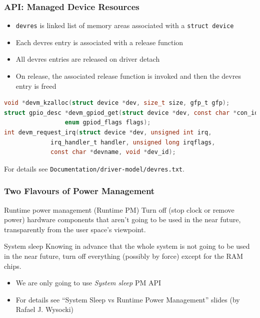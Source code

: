 \documentclass[aspectratio=169,usenames,dvipsnames]{beamer}
\newcounter{cont}
\begin{document}
\begin{frame}[containsverbatim]
  \frametitle{API: Managed Device Resources}

  \begin{itemize}
    \item \texttt{devres} is linked list of memory areas associated with a
          \texttt{struct device}
    \item Each devres entry is associated with a release function
    \item All devres entries are released on driver detach
    \item On release, the associated release function is invoked and then the
devres entry is freed
  \end{itemize}

  \begin{lstlisting}[language=c,numbers=none]
void *devm_kzalloc(struct device *dev, size_t size, gfp_t gfp);
struct gpio_desc *devm_gpiod_get(struct device *dev, const char *con_id,
				 enum gpiod_flags flags);
int devm_request_irq(struct device *dev, unsigned int irq,
		     irq_handler_t handler, unsigned long irqflags,
		     const char *devname, void *dev_id);
  \end{lstlisting}

  For details see \texttt{Documentation/driver-model/devres.txt}.
\end{frame}

\begin{frame}
  \frametitle{Two Flavours of Power Management}

  \begin{block}{Runtime power management (Runtime PM)}
Turn off (stop clock or remove power) hardware components that aren’t
going to be used in the near future, \alert{transparently} from the user space’s
viewpoint.
  \end{block}

  \begin{block}{System sleep}
Knowing in advance that \alert{the whole system} is not going to be used in the
near future, turn off \alert{everything} (possibly \alert{by force}) except for
the RAM chips.
  \end{block}

  \begin{itemize}
  \item We are only going to use \textit{System sleep} PM API
  \item For details see ``System Sleep vs Runtime Power Management'' slides
        (by Rafael J. Wysocki)
  \end{itemize}
\end{frame}
\end{document}
